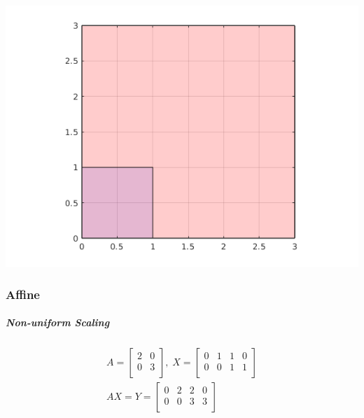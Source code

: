 \documentclass[MathsNotesBase.tex]{subfiles}
\begin{document}
{		\begin{center}
		\includegraphics[scale=0.85]{resources/img/GeometryOfMatrices_images/uniform_scaling.png}
		\end{center}
		
		\subsubsection{Affine}
		\subparagraph{Non-uniform Scaling}
		\begin{align*}
		A =
		\begin{bmatrix}    
		2  &  0 \\
		0  &  3 \\		
		\end{bmatrix}
		,\; X = 
		\begin{bmatrix}  
		0   &  1  &   1  &   0 \\
		0   &  0  &   1  &   1	\\	
		\end{bmatrix} \\[10pt]
		AX = Y = 
		\begin{bmatrix}   
		0  &   2  &  2  &  0 \\
		0  &   0  &  3  &  3 \\
		\end{bmatrix}
		\end{align*}
	
}
\end{document}
